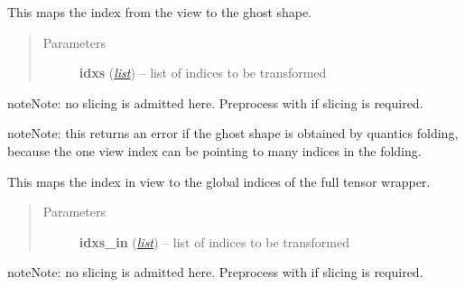 \documentclass[a4paper,10pt,english]{sphinxmanual}
\begin{document}
\begin{fulllineitems}

\begin{fulllineitems}
\label{api-tw:TensorToolbox.core.TensorWrapper.view_to_ghost}
This maps the index from the view to the ghost shape.
\begin{quote}\begin{description}
\item[{Parameters}] \leavevmode
\textbf{idxs} (\href{http://docs.python.org/library/functions.html\#list}{\emph{list}}) -- list of indices to be transformed

\end{description}\end{quote}

\begin{notice}{note}{Note:}
no slicing is admitted here. Preprocess  with  if slicing is required.
\end{notice}

\begin{notice}{note}{Note:}
this returns an error if the ghost shape is obtained by quantics folding, because the one view index can be pointing to many indices in the folding.
\end{notice}

\end{fulllineitems}


\begin{fulllineitems}
\label{api-tw:TensorToolbox.core.TensorWrapper.view_to_global}
This maps the index in view to the global indices of the full tensor wrapper.
\begin{quote}\begin{description}
\item[{Parameters}] \leavevmode
\textbf{idxs\_in} (\href{http://docs.python.org/library/functions.html\#list}{\emph{list}}) -- list of indices to be transformed

\end{description}\end{quote}

\begin{notice}{note}{Note:}
no slicing is admitted here. Preprocess  with  if slicing is required.
\end{notice}

\end{fulllineitems}


\end{fulllineitems}
\end{document}
